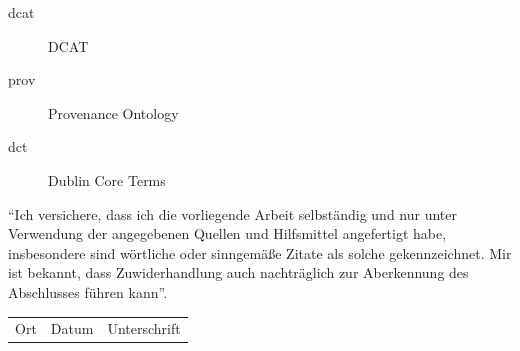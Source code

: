 \documentclass[a4paper,english,twoside,BCOR1.5cm,headsepline,DIV12,appendixprefix,final,12pt]{scrbook}
\begin{document}
\begin{description}
\item [dcat] DCAT
\item [prov] Provenance Ontology
\item [dct]  Dublin Core Terms
\end{description}

%
%
\printbibliography[title=References]

\thispagestyle{empty}
"`Ich versichere, dass ich die vorliegende Arbeit selbständig und nur unter Verwendung der angegebenen Quellen und Hilfsmittel angefertigt habe, insbesondere sind wörtliche oder sinngemäße Zitate als solche gekennzeichnet. Mir ist bekannt, dass Zuwiderhandlung auch nachträglich zur Aberkennung des Abschlusses führen kann"'.

\vspace{3cm}
\begin{tabularx}{\linewidth}{X X X}
Ort & Datum	& Unterschrift\\
\end{tabularx}
\end{document}
